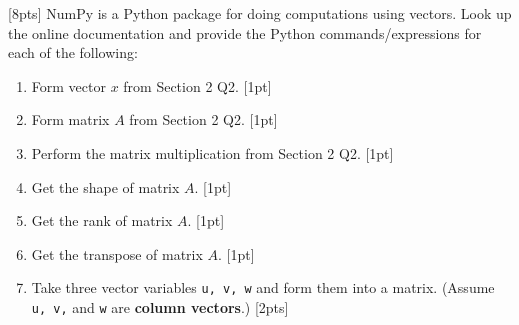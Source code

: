 \documentclass[11pt]{article}
\begin{document}
\vspace{2em}
 [8pts]
NumPy is a Python package for doing computations using vectors. Look up the online documentation and provide the Python commands/expressions for each of the following:
\begin{enumerate}[label=\alph*.]
  \setlength\itemsep{1em}
  \item Form vector $x$ from Section 2 Q2. [1pt]
  \item Form matrix $A$ from Section 2 Q2. [1pt]
  \item Perform the matrix multiplication from Section 2 Q2. [1pt]
  \item Get the shape of matrix $A$. [1pt]
  \item Get the rank of matrix $A$. [1pt]
  \item Get the transpose of matrix $A$. [1pt]
  \item Take three vector variables \texttt{u, v, w} and form them into a matrix. (Assume \texttt{u, v,} and \texttt{w} are \textbf{column vectors}.) [2pts]
\end{enumerate}
\end{document}
